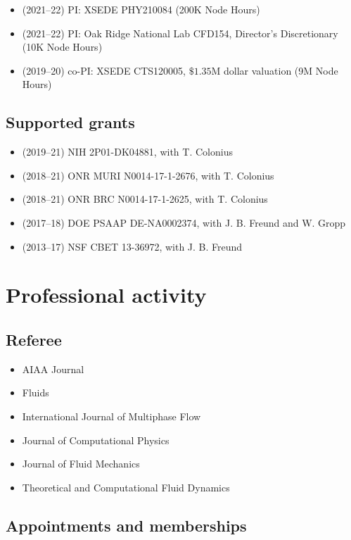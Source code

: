 \begin{itemize}
    \item (2021--22) PI: XSEDE PHY210084 (200K Node Hours)
    \item (2021--22) PI: Oak Ridge National Lab CFD154, Director's Discretionary (10K Node Hours)
    \item (2019--20) co-PI: XSEDE CTS120005, $\$1.35$M dollar valuation (9M Node Hours)
\end{itemize}

\subsection{Supported grants}

\begin{itemize}
    \item (2019--21) NIH 2P01-DK04881, with T. Colonius
    \item (2018--21) ONR MURI N0014-17-1-2676, with T. Colonius
    \item (2018--21) ONR BRC N0014-17-1-2625, with T. Colonius
    \item (2017--18) DOE PSAAP DE-NA0002374, with J. B. Freund and W. Gropp
    \item (2013--17) NSF CBET 13-36972, with J. B. Freund
\end{itemize}

\section{Professional activity}

\subsection{Referee}

\begin{itemize}
    \item AIAA Journal
    \item Fluids
    \item International Journal of Multiphase Flow
    \item Journal of Computational Physics
    \item Journal of Fluid Mechanics
    \item Theoretical and Computational Fluid Dynamics
\end{itemize}

\subsection{Appointments and memberships}

